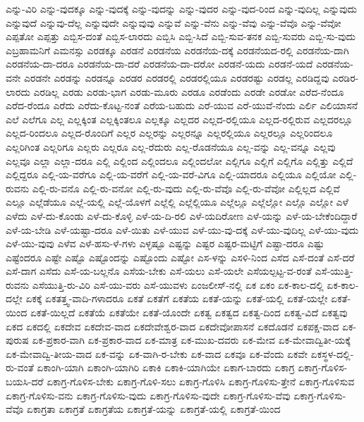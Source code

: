 {ಎನ್ನು-ವಿರಿ
ಎನ್ನು-ವುದಕ್ಕೂ
ಎನ್ನು-ವುದಕ್ಕೆ
ಎನ್ನು-ವುದನ್ನು
ಎನ್ನು-ವುದರ
ಎನ್ನು-ವುದ-ರಿಂದ
ಎನ್ನು-ವುದಿಲ್ಲ
ಎನ್ನುವುದು
ಎನ್ನುವುದೆ
ಎನ್ನುವು-ದೆಲ್ಲ
ಎನ್ನುವುದೇ
ಎನ್ನುವುವು
ಎನ್ನುವೆ
ಎನ್ನು-ವೆನು
ಎನ್ನು-ವೆವು
ಎನ್ನು-ವೆವೊ
ಎನ್ನು-ವೆವೋ
ಎಪ್ಪತೋ
ಎಪ್ಪತ್ತು
ಎಬ್ಬಿಸ-ದಂತೆ
ಎಬ್ಬಿಸ-ಲಾರದು
ಎಬ್ಬಿಸಿ
ಎಬ್ಬಿ-ಸಿದೆ
ಎಬ್ಬಿ-ಸುವ-ತನಕ
ಎಬ್ಬಿ-ಸುವರು
ಎಬ್ಬಿ-ಸು-ವುದು
ಎಬ್ರಹಾಮನಿಗೆ
ಎಮನಸ್ಸು
ಎರಡಕ್ಕೂ
ಎರಡನೆ
ಎರಡನೆಯ
ಎರಡನೆಯ-ದಕ್ಕೆ
ಎರಡನೆಯದ-ರಲ್ಲಿ
ಎರಡನೆಯ-ದಾಗಿ
ಎರಡನೆಯ-ದಾ-ದರೂ
ಎರಡನೆಯ-ದಾ-ದರೆ
ಎರಡನೆಯ-ದಾ-ದರೋ
ಎರಡನೆ-ಯದು
ಎರಡನೆ-ಯದೆ
ಎರಡನೆಯ-ವನೇ
ಎರಡನೇ
ಎರಡನ್ನು
ಎರಡನ್ನೂ
ಎರಡರ
ಎರಡರಲ್ಲಿ
ಎರಡರಲ್ಲಿಯೂ
ಎರಡರಷ್ಟು
ಎರಡಲ್ಲ
ಎರಡಿದ್ದವು
ಎರಡಿರ-ಲಾರದು
ಎರಡಿಲ್ಲ
ಎರಡು
ಎರಡು-ಭಾಗ
ಎರಡು-ಮೂರು
ಎರಡೂ
ಎರಡೆಂದು
ಎರಡೇ
ಎರಡೋ
ಎರೆದ-ನೆಂದೂ
ಎರೆದ-ರೆಂದೂ
ಎರೆದು
ಎರೆದು-ಕೊಟ್ಟ-ನಂತೆ
ಎರೆಯ-ಬಹುದು
ಎರೆ-ಯುವ
ಎರೆ-ಯುವೆ-ನೆಂದು
ಎರ್ಲಿ
ಎಲಿಯಾಸನೆ
ಎಲೆ
ಎಲೆಗೂ
ಎಲ್ಲ
ಎಲ್ಲಕ್ಕಿಂತ
ಎಲ್ಲಕ್ಕಿಂತಲೂ
ಎಲ್ಲಕ್ಕೂ
ಎಲ್ಲದರ
ಎಲ್ಲದ-ರಲ್ಲಿಯೂ
ಎಲ್ಲದ-ರಲ್ಲಿರುವ
ಎಲ್ಲದರಲ್ಲೂ
ಎಲ್ಲದ-ರಿಂದಲೂ
ಎಲ್ಲದ-ರೊಂದಿಗೆ
ಎಲ್ಲರ
ಎಲ್ಲರನ್ನು
ಎಲ್ಲರನ್ನೂ
ಎಲ್ಲರಲ್ಲಿಯೂ
ಎಲ್ಲರಲ್ಲೂ
ಎಲ್ಲರಿಂದಲೂ
ಎಲ್ಲರಿಗಿಂತ
ಎಲ್ಲರಿಗೂ
ಎಲ್ಲರು
ಎಲ್ಲರೂ
ಎಲ್ಲ-ರೆದುರು
ಎಲ್ಲ-ರೊಡನೆಯೂ
ಎಲ್ಲ-ವನ್ನು
ಎಲ್ಲ-ವನ್ನೂ
ಎಲ್ಲವು
ಎಲ್ಲವೂ
ಎಲ್ಲಾ
ಎಲ್ಲಾ-ದರೂ
ಎಲ್ಲಿ
ಎಲ್ಲಿಂದ
ಎಲ್ಲಿಂದಲೂ
ಎಲ್ಲಿಂದಲೋ
ಎಲ್ಲಿಗೂ
ಎಲ್ಲಿಗೆ
ಎಲ್ಲಿಗೊ
ಎಲ್ಲಿತ್ತು
ಎಲ್ಲಿದೆ
ಎಲ್ಲಿದ್ದರೂ
ಎಲ್ಲಿ-ಯ-ವರೆಗೂ
ಎಲ್ಲಿ-ಯ-ವರೆಗೆ
ಎಲ್ಲಿ-ಯ-ವರೆ-ವಿಗೂ
ಎಲ್ಲಿ-ಯಾದರೂ
ಎಲ್ಲಿಯೂ
ಎಲ್ಲಿಯೋ
ಎಲ್ಲಿ-ರುವನು
ಎಲ್ಲಿ-ರು-ವನೊ
ಎಲ್ಲಿ-ರು-ವನೋ
ಎಲ್ಲಿ-ರು-ವುದು
ಎಲ್ಲಿ-ರು-ವೆವೊ
ಎಲ್ಲಿ-ರು-ವೆವೋ
ಎಲ್ಲಿಲ್ಲದ
ಎಲ್ಲಿವೆ
ಎಲ್ಲೂ
ಎಲ್ಲೆಡೆಯೂ
ಎಲ್ಲೆ-ಯಲ್ಲಿ
ಎಲ್ಲೆ-ಯೊಳಗೆ
ಎಲ್ಲೆಲ್ಲಿ
ಎಲ್ಲೆಲ್ಲಿಯೂ
ಎಲ್ಲೆಲ್ಲೂ
ಎಲ್ಲೆಲ್ಲೋ
ಎಲ್ಲೊ
ಎಲ್ಲೋ
ಎಳೆ
ಎಳೆದು
ಎಳೆ-ದು-ಕೊಂಡು
ಎಳೆ-ದು-ಕೊಳ್ಳಿ
ಎಳೆ-ಯ-ದಿ-ರಲಿ
ಎಳೆ-ಯದಿರೋಣ
ಎಳೆ-ಯನ್ನು
ಎಳೆ-ಯ-ಬೇಕೆಂದಿದ್ದಾರೆ
ಎಳೆ-ಯ-ಬೇಡಿ
ಎಳೆ-ಯಷ್ಟಾ-ದರೂ
ಎಳೆ-ಯಿತು
ಎಳೆ-ಯುವ
ಎಳೆ-ಯು-ವು-ದಕ್ಕೆ
ಎಳೆ-ಯು-ವುದಿಲ್ಲ
ಎಳೆ-ಯು-ವುದು
ಎಳೆ-ಯು-ವುವು
ಎಳೆವ
ಎಳೆ-ಹಸು-ಳೆ-ಗಳು
ಎಳ್ಳಷ್ಟೂ
ಎಷ್ಟನ್ನು
ಎಷ್ಟರ
ಎಷ್ಟರ-ಮಟ್ಟಿಗೆ
ಎಷ್ಟಾ-ದರೂ
ಎಷ್ಟು
ಎಷ್ಟೆಂದರೂ
ಎಷ್ಟೇ
ಎಷ್ಟೊ
ಎಷ್ಟೊಂದನ್ನು
ಎಷ್ಟೊಂದು
ಎಷ್ಟೋ
ಎಸ-ಳನ್ನು
ಎಸಳಿ-ನಿಂದ
ಎಸೆದ
ಎಸೆ-ದಂತೆ
ಎಸೆ-ದರೆ
ಎಸೆ-ದಾಗ
ಎಸೆದು
ಎಸೆ-ಯ-ಬಲ್ಲನೊ
ಎಸೆಯ-ಬೇಕು
ಎಸೆ-ಯಲು
ಎಸೆ-ಯಲೇ
ಎಸೆಯಲ್ಪಟ್ಟ-ವ-ರಂತೆ
ಎಸೆ-ಯುತ್ತಿ-ರುವನು
ಎಸೆಯುತ್ತಿ-ರು-ವಿರಿ
ಎಸೆ-ಯು-ವರು
ಎಸೆ-ಯುವಳು
ಏಂಜಲೀಸ್-ನಲ್ಲಿ
ಏಕ
ಏಕಂ
ಏಕ-ಕಾಲ-ದಲ್ಲಿ
ಏಕ-ಕಾಲ-ದಲ್ಲೇ
ಏಕಕ್ಕೆ
ಏಕತತ್ತ್ವ-ವಾದಿ-ಗಳಾದರೂ
ಏಕತೆ
ಏಕತೆಗೆ
ಏಕತೆಯ
ಏಕತೆ-ಯನ್ನು
ಏಕತೆ-ಯಲ್ಲಿ
ಏಕತೆ-ಯಲ್ಲೇ
ಏಕತೆ-ಯಿಂದ
ಏಕತೆ-ಯಿಲ್ಲದೆ
ಏಕತೆಯೆ
ಏಕತೆಯೇ
ಏಕತೆ-ಯೊಂದೇ
ಏಕತ್ವ
ಏಕತ್ವದ
ಏಕತ್ವ-ದಿಂದ
ಏಕತ್ವ-ವಿದೆ
ಏಕತ್ವವು
ಏಕದ
ಏಕದಲ್ಲಿ
ಏಕದೇವ
ಏಕದೇವ-ವಾದ
ಏಕದೇವೇಶ್ವರ-ವಾದ
ಏಕದೇವೋಪಾಸನೆ
ಏಕದೊಡನೆ
ಏಕಪಕ್ಷ-ವಾದ
ಏಕ-ಪುರುಷ
ಏಕ-ಪ್ರಕಾರ-ವಾಗಿ
ಏಕ-ಪ್ರಕಾರ-ವಾದ
ಏಕ-ಮಾತ್ರ
ಏಕ-ಮುಖ-ದವರು
ಏಕ-ಮೇವ
ಏಕ-ಮೇವಾದ್ವಿತೀ-ಯಕ್ಕೆ
ಏಕ-ಮೇವಾದ್ವಿ-ತೀಯ-ವಾದ
ಏಕ-ವನ್ನು
ಏಕ-ವಾಗಿ-ರ-ಬೇಕು
ಏಕ-ವಾದ
ಏಕವೂ
ಏಕ-ವೆಂದು
ಏಕವೇ
ಏಕಸ್ಥಳ-ದಲ್ಲಿ-ರು-ವಂತೆ
ಏಕಾಂಗಿ-ಯಾಗಿ
ಏಕಾಂಗಿ-ಯಾಗಿರಿ
ಏಕಾಕಿ
ಏಕಾಕಿ-ಯಾಗಿಯೇ
ಏಕಾಗ-ಬಾರದು
ಏಕಾಗ್ರ
ಏಕಾಗ್ರ-ಗೊಳಿಸ-ಬಯಸಿ-ದರೆ
ಏಕಾಗ್ರ-ಗೊಳಿಸ-ಬೇಕು
ಏಕಾಗ್ರ-ಗೊಳಿ-ಸಲು
ಏಕಾಗ್ರ-ಗೊಳಿಸಿ
ಏಕಾಗ್ರ-ಗೊಳಿಸು-ತ್ತೇನೆ
ಏಕಾಗ್ರ-ಗೊಳಿಸುವ
ಏಕಾಗ್ರ-ಗೊಳಿಸು-ವನು
ಏಕಾಗ್ರ-ಗೊಳಿಸು-ವುದು
ಏಕಾಗ್ರ-ಗೊಳಿಸು-ವುದೇ
ಏಕಾಗ್ರ-ಗೊಳಿಸು-ವೆವು
ಏಕಾಗ್ರ-ಗೊಳಿಸು-ವೆವೊ
ಏಕಾಗ್ರತಾ
ಏಕಾಗ್ರತೆ
ಏಕಾಗ್ರತೆಯ
ಏಕಾಗ್ರತೆ-ಯನ್ನು
ಏಕಾಗ್ರತೆ-ಯಲ್ಲಿ
ಏಕಾಗ್ರತೆ-ಯಿಂದ
}
